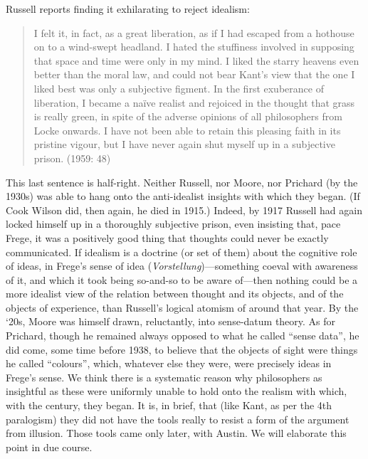Russell reports finding it exhilarating to reject idealism:
\begin{quote}
	I felt it, in fact, as a great liberation, as if I had escaped from a hothouse on to a wind-swept headland. I hated the stuffiness involved in supposing that space and time were only in my mind. I liked the starry heavens even better than the moral law, and could not bear Kant’s view that the one I liked best was only a subjective figment. In the first exuberance of liberation, I became a naïve realist and rejoiced in the thought that grass is really green, in spite of the adverse opinions of all philosophers from Locke onwards. I have not been able to retain this pleasing faith in its pristine vigour, but I have never again shut myself up in a subjective prison. (1959: 48)
\end{quote}
This last sentence is half-right. Neither Russell, nor Moore, nor Prichard (by the 1930s) was able to hang onto the anti-idealist insights with which they began. (If Cook Wilson did, then again, he died in 1915.) Indeed, by 1917 Russell had again locked himself up in a thoroughly subjective prison, even insisting that, pace Frege, it was a positively good thing that thoughts could never be exactly communicated. If idealism is a doctrine (or set of them) about the cognitive role of ideas, in Frege’s sense of idea (\emph{Vorstellung})---something coeval with awareness of it, and which it took being so-and-so to be aware of---then nothing could be a more idealist view of the relation between thought and its objects, and of the objects of experience, than Russell’s logical atomism of around that year. By the ‘20s, Moore was himself drawn, reluctantly, into sense-datum theory. As for Prichard, though he remained always opposed to what he called ``sense data'', he did come, some time before 1938, to believe that the objects of sight were things he called ``colours'', which, whatever else they were, were precisely ideas in Frege’s sense. We think there is a systematic reason why philosophers as insightful as these were uniformly unable to hold onto the realism with which, with the century, they began. It is, in brief, that (like Kant, as per the 4th paralogism) they did not have the tools really to resist a form of the argument from illusion. Those tools came only later, with Austin. We will elaborate this point in due course.

